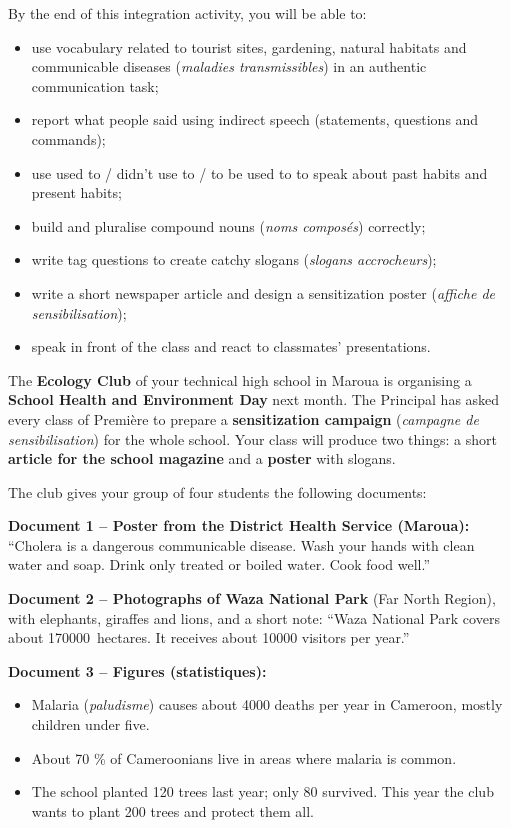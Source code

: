 \documentclass[11pt]{article}
\newcommand{\cle}[1]{{\popxbold\color{popdark}#1}}
\newcounter{popsec}
\newcounter{popsub}
\newcommand{\courssub}[1]{%
  \stepcounter{popsub}%
  \par\vspace{9pt}\noindent{\popxbold\fontsize{11.5}{13}\selectfont\color{popink}{\color{poporange}\thepopsec.\thepopsub}\hspace{6pt}#1}\par\nopagebreak\vspace{4pt}
}
\begin{document}
By the end of this integration activity, you will be able to:
\begin{itemize}
\item use vocabulary related to \cle{tourist sites}, \cle{gardening}, \cle{natural habitats} and \cle{communicable diseases} (\emph{maladies transmissibles}) in an authentic communication task;
\item report what people said using \cle{indirect speech} (statements, questions and commands);
\item use \cle{used to / didn't use to / to be used to} to speak about past habits and present habits;
\item build and pluralise \cle{compound nouns} (\emph{noms composés}) correctly;
\item write \cle{tag questions} to create catchy slogans (\emph{slogans accrocheurs});
\item write a short newspaper article and design a sensitization poster (\emph{affiche de sensibilisation});
\item speak in front of the class and react to classmates' presentations.
\end{itemize}

\courssub{Situation}

The \textbf{Ecology Club} of your technical high school in Maroua is organising a \textbf{School Health and Environment Day} next month. The Principal has asked every class of Première to prepare a \textbf{sensitization campaign} (\emph{campagne de sensibilisation}) for the whole school. Your class will produce two things: a short \textbf{article for the school magazine} and a \textbf{poster} with slogans.

The club gives your group of four students the following documents:

\textbf{Document 1 -- Poster from the District Health Service (Maroua):} ``Cholera is a dangerous communicable disease. Wash your hands with clean water and soap. Drink only treated or boiled water. Cook food well.''

\textbf{Document 2 -- Photographs of Waza National Park} (Far North Region), with elephants, giraffes and lions, and a short note: ``Waza National Park covers about \SI{170000}{hectares}. It receives about \num{10000} visitors per year.''

\textbf{Document 3 -- Figures (statistiques):}
\begin{itemize}
\item Malaria (\emph{paludisme}) causes about \num{4000} deaths per year in Cameroon, mostly children under five.
\item About \num{70} \% of Cameroonians live in areas where malaria is common.
\item The school planted \num{120} trees last year; only \num{80} survived. This year the club wants to plant \num{200} trees and protect them all.
\end{itemize}
\end{document}
